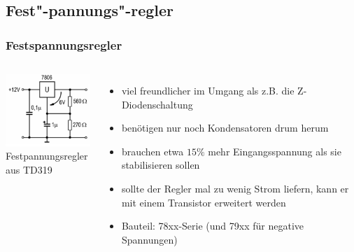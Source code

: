 \subsection*{Fest"-pannungs"-regler}
\begin{frame}
  \frametitle{Festspannungsregler}
  \begin{columns}
    \includegraphics[width=1\textwidth,height=.8\textheight,keepaspectratio]{a17/TD319.png}\\
    {\tiny Festpannungsregler aus TD319 \hyperlink{refs}{\cite{bna}}}
    \begin{itemize}
      \item viel freundlicher im Umgang als z.B. die Z-Diodenschaltung
      \item benötigen nur noch Kondensatoren drum herum
      \item brauchen etwa $15\%$ mehr Eingangsspannung als sie stabilisieren sollen
      \item sollte der Regler mal zu wenig Strom liefern, kann er mit einem Transistor erweitert werden
      \item Bauteil: 78xx-Serie (und 79xx für negative Spannungen)
    \end{itemize}
  \end{columns}
\end{frame}

